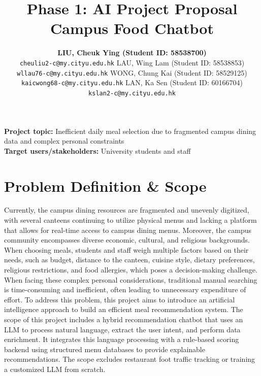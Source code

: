 \documentclass{article}
\title{Phase 1: AI Project Proposal\\
\large Campus Food Chatbot}
\author{
  \textbf{LIU, Cheuk Ying (Student ID: 58538700)}\\
  \texttt{cheuliu2-c@my.cityu.edu.hk}
  \And
  LAU, Wing Lam (Student ID: 58538853)\\
  \texttt{wllau76-c@my.cityu.edu.hk}
  \AND
  WONG, Chung Kai (Student ID: 58529125)\\
  \texttt{kaicwong68-c@my.cityu.edu.hk}
  \And
  LAN, Ka Sen (Student ID: 60166704)\\
  \texttt{kslan2-c@my.cityu.edu.hk}
}
\begin{document}
\maketitle

\noindent\textbf{Project topic:} Inefficient daily meal selection due to fragmented campus dining data and complex personal constraints\\
\textbf{Target users/stakeholders:} University students and staff


\section{Problem Definition \& Scope}
Currently, the campus dining resources are fragmented and unevenly digitized, with several canteens continuing to utilize physical menus and lacking a platform that allows for real-time access to campus dining menus. Moreover, the campus community encompasses diverse economic, cultural, and religious backgrounds. When choosing meals, students and staff weigh multiple factors based on their needs, such as budget, distance to the canteen, cuisine style, dietary preferences, religious restrictions, and food allergies, which poses a decision-making challenge. When facing these complex personal considerations, traditional manual searching is time-consuming and inefficient, often leading to unnecessary expenditure of effort. To address this problem, this project aims to introduce an artificial intelligence approach to build an efficient meal recommendation system.
The scope of this project includes a hybrid recommendation chatbot that uses an LLM to process natural language, extract the user intent, and perform data enrichment. It integrates this language processing with a rule-based scoring backend using structured menu databases to provide explainable recommendations.
The scope excludes restaurant foot traffic tracking or training a customized LLM from scratch.
\end{document}
